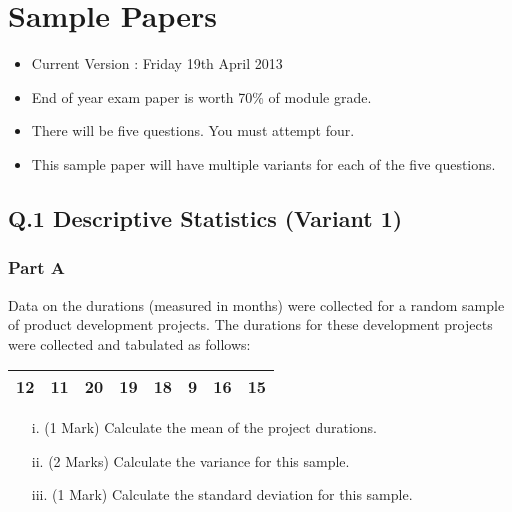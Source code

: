 \documentclass[a4paper,12pt]{article}
\begin{document}
\tableofcontents

\section*{Sample Papers}
\begin{itemize}
\item Current Version : Friday 19th April 2013
\item End of year exam paper is worth 70\% of module grade.
\item There will be five questions. You must attempt four.
\item This sample paper will have multiple variants for each of the five questions.
\end{itemize}
\newpage

\subsection*{Q.1 Descriptive Statistics (Variant 1)}
\subsubsection*{Part A} %
Data on the durations (measured in months) were collected for a random sample of product development projects.
The durations for these development projects were collected and tabulated as follows:

\begin{table}[ht]
\begin{center}
\begin{tabular}{|rrrrrrrr|}

\hline
12 & 11 & 20 & 19 & 18 & 9 & 16 & 15 \\
\hline
\end{tabular}
\end{center}
\end{table}
\vspace{-0.5cm}


\begin{itemize}
\item[i.](1 Mark) Calculate the mean of the project durations.
\item[ii.](2 Marks) Calculate the variance for this sample.
\item[iii.](1 Mark) Calculate the standard deviation for this sample.
\end{itemize}
\end{document}
